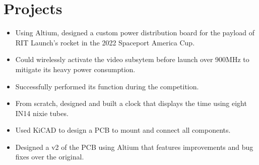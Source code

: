\documentclass[]{deedy-resume-openfont}
\begin{document}
\begin{minipage}[t]{0.66\textwidth}




\section{Projects}

\begin{itemize}
    \setlength\itemsep{0pt}
    \item Using Altium, designed a custom power distribution board for the payload of RIT Launch's rocket in the 2022 Spaceport America Cup.
    \item Could wirelessly activate the video subsytem before launch over 900MHz to mitigate its heavy power consumption. 
    \item Successfully performed its function during the competition.    
\end{itemize}

\sectionsep

\begin{itemize}
    \setlength\itemsep{0pt}
    \item From scratch, designed and built a clock that displays the time using eight IN14 nixie tubes.
    \item Used KiCAD to design a PCB to mount and connect all components.
    \item Designed a v2 of the PCB using Altium that features improvements and bug fixes over the original.
\end{itemize}


\end{minipage}
\end{document}
